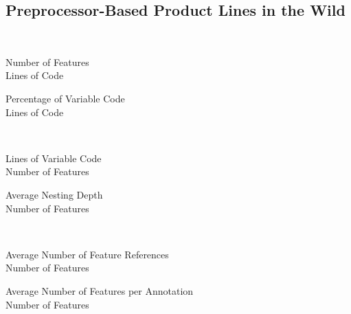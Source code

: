 \subsection{Preprocessor-Based Product Lines in the Wild}
\begin{frame}{\myframetitle\ \mytitlesource{\fortyproductlines}}
	\begin{mycolumns}[forget]
		\begin{exampletight}{Number of Features}
			\centering{}\\Lines of Code
		\end{exampletight}
	\mynextcolumn
		\begin{exampletight}{Percentage of Variable Code}
			\centering{}\\Lines of Code
		\end{exampletight}
	\end{mycolumns}
\end{frame}

\begin{frame}{\myframetitle\ \mytitlesource{\fortyproductlines}}
	\begin{mycolumns}[forget]
		\begin{exampletight}{Lines of Variable Code}
			\centering{}\\Number of Features
		\end{exampletight}
	\mynextcolumn
		\begin{exampletight}{Average Nesting Depth}
			\centering{}\\Number of Features
		\end{exampletight}
	\end{mycolumns}
\end{frame}

\begin{frame}{\myframetitle\ \mytitlesource{\fortyproductlines}}
	\begin{mycolumns}[forget]
		\begin{exampletight}{Average Number of Feature References}
			\centering{}\\Number of Features
		\end{exampletight}
	\mynextcolumn
		\begin{exampletight}{Average Number of Features per Annotation}
			\centering{}\\Number of Features
		\end{exampletight}
	\end{mycolumns}
\end{frame}

